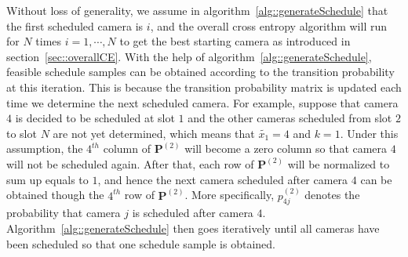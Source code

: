 Without loss of generality, we assume in algorithm~\ref{alg::generateSchedule} that the first scheduled camera is $i$, and the overall cross entropy algorithm will run for $N$ times ${i=1,\cdots,N}$ to get the best starting camera as introduced in section~\ref{sec::overallCE}.
With the help of algorithm~\ref{alg::generateSchedule}, feasible schedule samples can be obtained according to the transition probability at this iteration.
This is because the transition probability matrix is updated each time we determine the next scheduled camera.
For example, suppose that camera $4$ is decided to be scheduled at slot $1$ and the other cameras scheduled from slot $2$ to slot $N$ are not yet determined, which means that ${\tilde{x_1} = 4}$ and ${k=1}$.
Under this assumption, the $4^{th}$ column of $\mathbf{P}^{(2)}$ will become a zero column so that camera $4$ will not be scheduled again.
After that, each row of $\mathbf{P}^{(2)}$ will be normalized to sum up equals to $1$, and hence the next camera scheduled after camera $4$ can be obtained though the $4^{th}$ row of $\mathbf{P}^{(2)}$.
More specifically, $p_{4j}^{(2)}$ denotes the probability that camera $j$ is scheduled after camera $4$.
Algorithm~\ref{alg::generateSchedule} then goes iteratively until all cameras have been scheduled so that one schedule sample is obtained.
%
